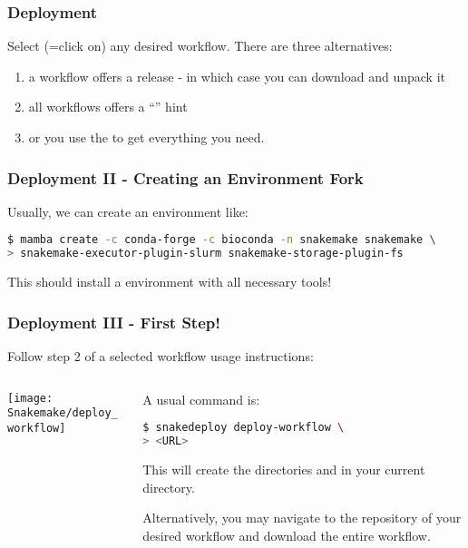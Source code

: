 \begin{frame}[fragile]
  \frametitle{Deployment}
  Select (=click on) any desired workflow. There are three alternatives:
  \begin{enumerate}[<+->]
   \item a workflow offers a release - in which case you can download and unpack it
   \item all workflows offers a ``'' hint
   \item or you use the  to get everything you need.
  \end{enumerate}
\end{frame}

\begin{frame}[fragile]
	\frametitle{Deployment II - Creating an Environment Fork}
	Usually, we can create an environment like:
	\begin{lstlisting}[language=Bash, style=Shell]
$ mamba create -c conda-forge -c bioconda -n snakemake snakemake \
> snakemake-executor-plugin-slurm snakemake-storage-plugin-fs
    \end{lstlisting}
    This should install a \Snakemake{} environment with all necessary tools!
       
\end{frame}

\begin{frame}[fragile]
	\frametitle{Deployment III - First Step!}
	Follow step 2 of a selected workflow usage instructions:
	\begin{columns}
		\begin{column}{0.4\textwidth}
			\centering
			\texttt{[image: Snakemake/deploy\_workflow]}
		\end{column}
	    \begin{column}{0.6\textwidth}
	    	A usual command is:
	    	\begin{lstlisting}[language=Bash, style=Shell]
$ snakedeploy deploy-workflow \
> <URL>
	    	\end{lstlisting}
    	    This will create the directories  and  in your current directory.
    	    \begin{hint}
    	    	Alternatively, you may navigate to the repository of your desired workflow and download the entire workflow.
    	    \end{hint}
	    \end{column}
	\end{columns}
\end{frame}

